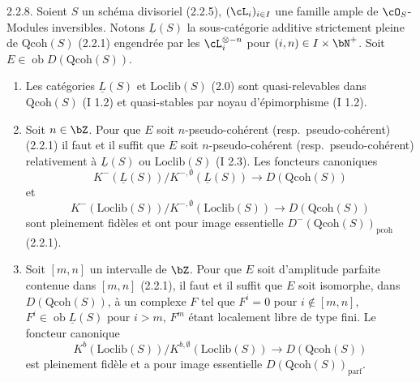 \begin{lemme} 2.2.8.
Soient $S$ un sch\'{e}ma divisoriel (2.2.5), $(\cL_i)_{i \in I}$ une famille ample de $\cO_S$-Modules inversibles. Notons $\underline{L}(S)$ la sous-cat\'{e}gorie additive strictement pleine de $\mathrm{Qcoh}(S)$ (2.2.1) engendr\'{e}e par les $\cL_i^{\otimes -n}$ pour $(i,n) \in I \times \bN^+$. Soit $E \in \operatorname{ob} D(\mathrm{Qcoh}(S))$.
\begin{enumerate}
\item[a)] Les cat\'{e}gories $\underline{L}(S)$ et $\mathrm{Loclib}(S)$ (2.0) sont quasi-relevables dans $\mathrm{Qcoh}(S)$ (I 1.2) et quasi-stables par noyau d'\'{e}pimorphisme (I 1.2).
\item[b)] Soit $n \in \bZ$. Pour que $E$ soit $n$-pseudo-coh\'{e}rent (resp.~pseudo-coh\'{e}rent) (2.2.1) il faut et il suffit que $E$ soit $n$-pseudo-coh\'{e}rent (resp.~pseudo-coh\'{e}rent) relativement \`{a} $\underline{L}(S)$ ou $\mathrm{Loclib}(S)$ (I 2.3). Les foncteurs canoniques
\[
K^-(\underline{L}(S)) / K^{-,\emptyset}(\underline{L}(S)) \longrightarrow D(\mathrm{Qcoh}(S))
\]
et
\[
K^-(\mathrm{Loclib}(S)) / K^{-,\emptyset}(\mathrm{Loclib}(S)) \longrightarrow D(\mathrm{Qcoh}(S))
\]
sont pleinement fid\`{e}les et ont pour image essentielle $D^-(\mathrm{Qcoh}(S))_{\mathrm{pcoh}}$ (2.2.1).
\item[c)] Soit $[m,n]$ un intervalle de $\bZ$. Pour que $E$ soit d'amplitude parfaite contenue dans $[m,n]$ (2.2.1), il faut et il suffit que $E$ soit isomorphe, dans $D(\mathrm{Qcoh}(S))$, \`{a} un complexe $F$ tel que $F^i = 0$ pour $i \notin [m,n]$, $F^i \in \operatorname{ob} \underline{L}(S)$ pour $i > m$, $F^m$ \'{e}tant localement libre de type fini. Le foncteur canonique
\[
K^b(\mathrm{Loclib}(S)) / K^{b,\emptyset}(\mathrm{Loclib}(S)) \longrightarrow D(\mathrm{Qcoh}(S))
\]
est pleinement fid\`{e}le et a pour image essentielle $D(\mathrm{Qcoh}(S))_{\mathrm{parf}}$.
\end{enumerate}
\end{lemme}

